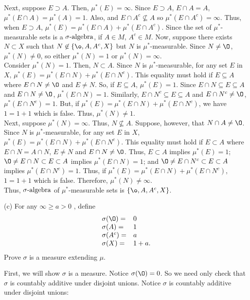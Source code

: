 \begin{enumerate}
\begin{pf}
Next, suppose $E \supset A$. Then, $\mu^*(E) = \infty$. Since $E \supset A$, $E \cap A = A$, $\mu^*(E \cap A)=\mu^{*}(A)=1$. Also, and $E \cap A^c\not\subseteq A$ so $\mu^*(E \cap A^c) = \infty$. Thus, when $E \supset A$, $\mu^*(E)=\mu^*(E\cap A) + \mu^*(E \cap A^c)$.
Since the set of $\mu^*$-measurable sets is a ${\sigma}\text{-algebra}$, if $A \in M$, $A^c \in M$. 
Now, suppose there exists $N \subset X$ such that $N \not\in \{ \o, A, A^c, X \}$ but $N$ is $\mu^{*}$-measurable. Since $N \neq \O$, $\mu^*(N)\neq 0$, so either $\mu^*(N)= 1$ or $\mu^*(N)=\infty$.\\ 
Consider $\mu^*(N)=1$. Then, $N \subset A$. Since $N$ is $\mu^*$-measurable, for any set $E$ in $X$, $\mu^*(E)=\mu^*(E\cap N) + \mu^*(E \cap N^c)$. This equality must hold if $E \subseteq A$ where $E \cap N \neq \O$ and $E \neq N$. So, if $E \subseteq A$, $\mu^*(E)=1$. Since $E \cap N \subseteq E \subseteq A$ and $E \cap N \neq \O$, $\mu^*(E \cap N) = 1$. Similarly, $E \cap N^c \subseteq E \subseteq A$ and $E \cap N^c \neq \O$, $\mu^* (E \cap N^c) =1$. But, if $\mu^*(E)=\mu^*(E\cap N) + \mu^*(E \cap N^c)$, we have $1 = 1 + 1$ which is false. Thus, $\mu^*(N)\neq 1$. \\
Next, suppose $\mu^*(N)=\infty$. Thus, $N \not \subseteq A$. Suppose, however, that $N \cap A \neq \O$. Since $N$ is $\mu^*$-measurable, for any set $E$ in $X$, $\mu^*(E)=\mu^*(E\cap N) + \mu^*(E \cap N^c)$. This equality must hold if $E \subset A$ where $E \cap N = A \cap N$, $E \neq N$ and $E \cap N \neq \O$. Thus, $E \subset A$ implies $\mu^*(E)=1$; $\O \neq E \cap N \subset E \subset A$ implies $\mu^*(E \cap N)=1$; and $\O \neq E \cap N^c \subset E \subset A $ implies $\mu^*(E \cap N^c)=1$. Thus, if $\mu^*(E)=\mu^*(E\cap N) + \mu^*(E \cap N^c)$, $1 = 1 + 1$ which is false. Therefore, $\mu^*(N)\neq \infty$. \\
Thus, ${\sigma}\text{-algebra}$ of $\mu^*$-measurable sets is $\{ \o, A, A^c, X \}$.
\end{pf}
(c) For any $\infty \geq a > 0$ , define 
\[
\begin{array}{ll}
\sigma(\O)= & 0 \\
\sigma(A)= & 1 	\\
\sigma(A^c)= & a \\
\sigma(X)= & 1 + a.
\end{array}
\]
Prove $\sigma$ is a measure extending $\mu$. 
\begin{pf}
First, we will show $\sigma$ is a measure. Notice $\sigma(\O)=0$. So we need only check that $\sigma$ is countably additive under disjoint unions. Notice $\sigma$ is countably additive under disjoint unions:

\end{pf}
\end{enumerate}
